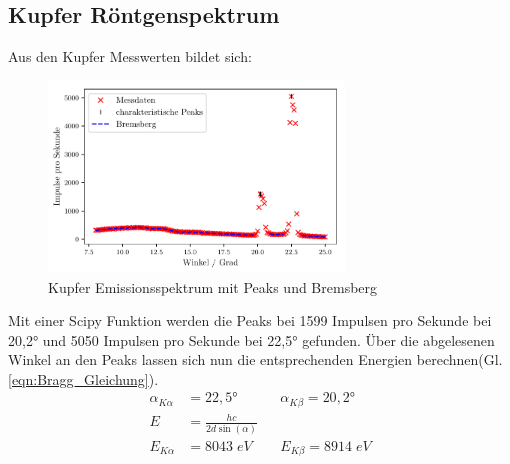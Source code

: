 \subsection{Kupfer Röntgenspektrum}
Aus den Kupfer Messwerten bildet sich:
\begin{figure}[H]
    \centering
    \includegraphics[width=0.7\textwidth]{plots/CU_Spektrum.pdf}
    \caption{Kupfer Emissionsspektrum mit Peaks und Bremsberg}
    \label{fig:CU_Spektrum}
\end{figure}
Mit einer Scipy Funktion werden die Peaks bei 1599 Impulsen pro Sekunde bei 20,2° und 5050 Impulsen pro Sekunde bei 22,5° gefunden.
Über die abgelesenen Winkel an den Peaks lassen sich nun die entsprechenden Energien berechnen(Gl. \ref{eqn:Bragg_Gleichung}).
\begin{align}
    \alpha_{K\alpha} &= 22,5° &&   \alpha_{K\beta} = 20,2° \nonumber \\
    E &= \frac{hc}{2d\sin(\alpha)} \nonumber \\
    E_{K\alpha} &= 8043 \; eV && E_{K\beta} = 8914\; eV \label{eqn:Energien_Spektrum}
\end{align}

